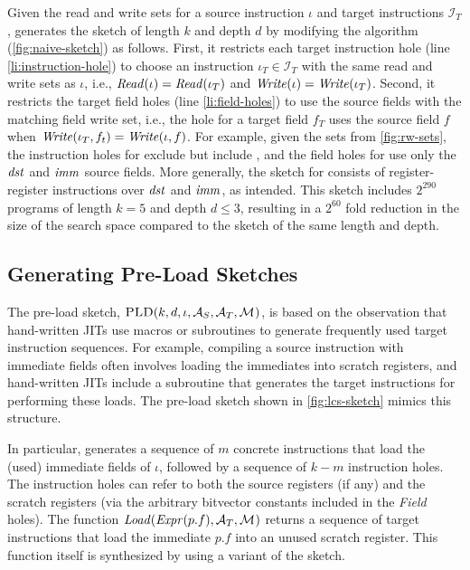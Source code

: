 Given the read and write sets for a source instruction $\iota$ and target
instructions $\mathcal{I}_T$, \jitsynth generates the \RW sketch of length $k$
and depth $d$ by modifying the \Naive algorithm (\autoref{fig:naive-sketch}) as
follows. First, it restricts each target instruction hole (line
\ref{li:instruction-hole}) to choose an instruction $\iota_T\in\mathcal{I}_T$
with the same read and write sets as $\iota$, i.e., $\mathit{Read}(\iota) =
\mathit{Read}(\iota_T)$ and  $\mathit{Write}(\iota) = \mathit{Write}(\iota_T)$. Second, it restricts the
target field holes (line \ref{li:field-holes}) to use the source fields with the
matching field write set, i.e., the hole for a target field $f_T$ uses the
source field $f$ when $\mathit{Write}(\iota_T, f_t) = \mathit{Write}(\iota, f)$. For example,
given the sets from \autoref{fig:rw-sets}, the \RW instruction holes for
 exclude  but include , and the field holes for
 use only the $\mathit{dst}$ and $\mathit{imm}$ source fields. More
generally, the \RW sketch for  consists of register-register
instructions over $\mathit{dst}$ and $\mathit{imm}$, as intended. This sketch
includes $2^{290}$ programs of length $k=5$ and depth $d\leq 3$, resulting in a
$2^{60}$ fold reduction in the size of the search space compared to the \Naive
sketch of the same length and depth. 



\subsection{Generating Pre-Load Sketches}\label{s:algorithm:pld} 

The pre-load sketch, $\LCS(k, d, \iota, \arm_S, \arm_T, \Map)$, is based on the
observation that hand-written JITs use macros or subroutines to generate
frequently used target instruction sequences. For example, compiling a source
instruction with immediate fields often involves loading the immediates into
scratch registers, and hand-written JITs include a subroutine that generates the
target instructions for performing these loads. The pre-load sketch shown in
\autoref{fig:lcs-sketch} mimics this structure.\tighten 


In particular, \LCS generates a sequence of $m$ concrete instructions that load
the (used) immediate fields of $\iota$, followed by a sequence of $k-m$
instruction holes. The instruction holes can refer to both the source registers
(if any) and the scratch registers (via the arbitrary bitvector constants
included in the \emph{Field} holes). The function
$\mathit{Load}(\mathit{Expr}(p.f), \mathcal{A}_T, \mathcal{M}_{})$ returns a sequence of target
instructions that load the immediate $p.f$ into an unused scratch register. This
function itself is synthesized by \jitsynth using a variant of the \RW
sketch.\tighten 

